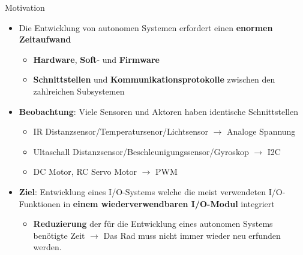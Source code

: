 \documentclass{beamer}
\begin{document}
\begin{frame}{Motivation}
	\begin{itemize}
		\item Die Entwicklung von autonomen Systemen erfordert einen \textbf{enormen Zeitaufwand}
		\begin{itemize}
			\item \textbf{Hardware}, \textbf{Soft}- und \textbf{Firmware}
			\item \textbf{Schnittstellen} und \textbf{Kommunikationsprotokolle} zwischen den zahlreichen Subsystemen
		\end{itemize}
	\end{itemize}
	\begin{itemize}
		\item \textbf{Beobachtung}: Viele Sensoren und Aktoren haben identische Schnittstellen
		\begin{itemize}
			\item IR Distanzsensor/Temperatursenor/Lichtsensor  $\rightarrow$ Analoge Spannung
			\item Ultaschall Distanzsensor/Beschleunigungssensor/Gyroskop $\rightarrow$ I2C
			\item DC Motor, RC Servo Motor $\rightarrow$ PWM
		\end{itemize}
	\end{itemize}
	\begin{itemize}
		\item \textbf{Ziel}: Entwicklung eines I/O-Systems welche die meist verwendeten I/O-Funktionen in \textbf{einem wiederverwendbaren I/O-Modul} integriert
		\begin{itemize}
			\item \textbf{Reduzierung} der f\"ur die Entwicklung eines autonomen Systems ben\"otigte Zeit $\rightarrow$ Das Rad muss nicht immer wieder neu erfunden werden.
		\end{itemize}
	\end{itemize}
\end{frame}
\end{document}
